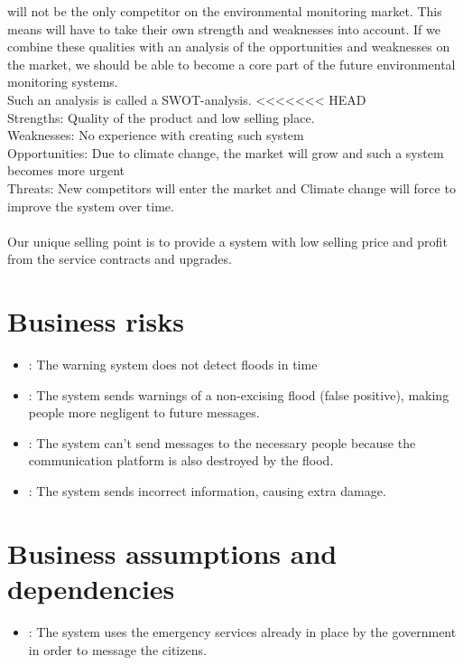 \CompanyName will not be the only competitor on the environmental monitoring market. This means \CompanyName will have to take their own strength and weaknesses into account. If we combine these qualities with an analysis of the opportunities and weaknesses on the market, we should be able to become a core part of the future environmental monitoring systems.\\

Such an analysis is called a SWOT-analysis. 
<<<<<<< HEAD
\\
Strengths: Quality of the product and low selling place.\\ 
Weaknesses: No experience with creating such system\\
Opportunities: Due to climate change, the market will grow and such a system becomes more urgent \\
Threats: New competitors will enter the market and Climate change will force to improve the system over time. \\\\

Our unique selling point is to provide a system with low selling price and profit from the service contracts and upgrades.

\section{Business risks}
\begin{itemize}
	\item {}: The warning system does not detect floods in time
	\item {}: The system sends warnings of a non-excising flood (false positive), making people more negligent to future messages.
	\item {}: The system can't send messages to the necessary people because the communication platform is also destroyed by the flood.
	\item {}: The system sends incorrect information, causing extra damage.
\end{itemize}

\section{Business assumptions and dependencies}
\begin{itemize}
	\item {}: The system uses the emergency services already in place by the government in order to message the citizens.
	
\end{itemize}

